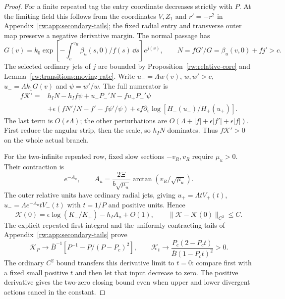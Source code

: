 \begin{proof}
For a finite repeated tag the entry coordinate decreases strictly
with $P$. At the limiting field this follows from the coordinates
$V,Z_1$ and $r'=-r^2$ in
Appendix~\ref{rw:app:secondary-tails}; the fixed radial entry
and transverse outer map preserve a negative derivative margin.
The normal passage has
\[
 G(v)=k_0\exp[-\int_v^{v_R}\beta_u(s,0)/f(s)\,\dd s]e^{j(v)},
 \qquad N=fG'/G=\beta_u(v,0)+fj'>c .
\]
The selected ordinary jets of $j$ are bounded by
Proposition~\ref{rw:relative-core} and
Lemma~\ref{rw:transitions:moving-rate}.
Write $u_+=\Lambda w(v)$, $w,w'>c$,
$u_-=\Lambda k_1G(v)$ and $\psi=w'/w$.
The full numerator is
\begin{equation}\label{rw:secondary:finite-repeated-numerator}
\begin{aligned}
 f\mathcal K'={}&h_IN-h_If\psi
       +u_-P_-'N-fu_+P_+'\psi\\
 &+\epsilon(fN'/N-f'-f\psi'/\psi)
       +\epsilon f\partial_v\log[H_-(u_-)/H_+(u_+)] .
\end{aligned}
\end{equation}
The last term is $O(\epsilon\Lambda)$; the other perturbations
are $O(\Lambda+|f|+\epsilon|f'|+\epsilon|f|)$.
First reduce the angular strip, then the scale, so $h_IN$
dominates. Thus $f\mathcal K'>0$ on the whole actual branch.

For the two-infinite repeated row, fixed slow sections
$-v_R,v_R$ require $\mu_u>0$. Their contraction is
\[
 e^{-A_u},\qquad
 A_u=\frac{2\Xi}{b\sqrt{\mu_u}}\arctan(v_R/\sqrt{\mu_u}).
\]
The outer relative units have ordinary radial jets, giving
$u_+=\Lambda tV_+(t)$,
$u_-=\Lambda e^{-A_u}tV_-(t)$ with $t=1/P$ and positive units.
Hence
\[
 \mathcal K(0)=\epsilon\log(K_-/K_+)-h_IA_u+O(1),\qquad
 \|\mathcal K-\mathcal K(0)\|_{C^2}\le C .
\]
The explicit repeated first integral and the uniformly contracting
tails of Appendix~\ref{rw:app:secondary-tails} prove
\begin{equation}\label{rw:secondary:repeated-limit}
 \mathcal K_P\longrightarrow
 \bar B^{-1}[P^{-1}-P/(P-P_c)^2],\qquad
 \mathcal K_t\longrightarrow
 \frac{P_c(2-P_ct)}{\bar B(1-P_ct)^2}>0 .
\end{equation}
The ordinary $C^2$ bound transfers this derivative limit to $t=0$:
compare first with a fixed small positive $t$ and then let that input
decrease to zero. The positive derivative gives the two-zero closing
bound even when upper and lower divergent actions cancel in the constant.


\end{proof}
